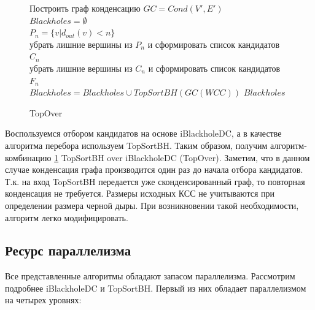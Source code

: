 \documentclass[12pt,a4paper,oneside,openany]{article}
\theoremstyle{definition}
\theoremstyle{lemma}
\theoremstyle{remark}
\begin{document}
\linespread{1.0}
\begin{figure}[H]
	\begin{center}
		\begin{algorithm}[H]
			\SetAlgoLined
                        Построить граф конденсацию $GC = Cond(V',E')$ \\
                        $Blackholes = \emptyset$ \\
                        $P_n = \{v | d_{out}(v) < n\}$ \\
                        убрать лишние вершины из $P_n$ и сформировать список кандидатов $C_n$ \\
                        убрать лишние вершины из $C_n$ и сформировать список кандидатов $F_n$ \\
                         {
                            $Blackholes = Blackholes \cup TopSortBH(GC(WCC))$
                        }
                        \Return $Blackholes$
			\label{alg:topover}
			\caption{TopOver}
		\end{algorithm}
	\end{center}
\end{figure}
\linespread{1.5}

Воспользуемся отбором кандидатов на основе iBlackholeDC, а в качестве алгоритма перебора используем TopSortBH.
Таким образом, получим алгоритм-комбинацию \ref{alg:topover} TopSortBH over iBlackholeDC (TopOver).
Заметим, что в данном случае конденсация графа производится один раз до начала отбора кандидатов.
Т.к. на вход TopSortBH передается уже сконденсированный граф, то повторная конденсация не требуется.
Размеры исходных КСС не учитываются при определении размера черной дыры. При возникновении такой необходимости,
алгоритм легко модифицировать.

\subsection{Ресурс параллелизма}\label{subsec:parallelresource}

Все представленные алгоритмы обладают запасом параллелизма.
Рассмотрим подробнее iBlackholeDC и TopSortBH.
Первый из них обладает параллелизмом на четырех уровнях:
\end{document}
